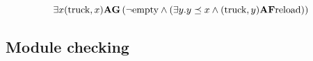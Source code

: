\[\exists x (\text{truck},x) {\bf A} {\bf G} \left ( \neg \text{empty} \wedge
  (\exists y. y\preceq x \wedge (\text{truck},y){\bf A}{\bf F} \text{reload}) \right )\]


\subsection{Module checking}
\label{section:module}








